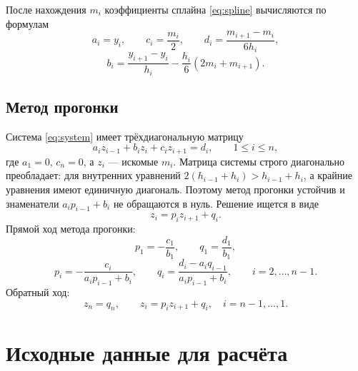 \documentclass[14pt,a4paper]{extarticle}
\begin{document}
После нахождения $m_i$ коэффициенты сплайна \eqref{eq:spline}
вычисляются по формулам
\begin{equation}
    a_i=y_i,\qquad
    c_i=\frac{m_i}{2},\qquad
    d_i=\frac{m_{i+1}-m_i}{6h_i},
    \label{eq:coeff-cd}
\end{equation}
\begin{equation}
    b_i=\frac{y_{i+1}-y_i}{h_i}
    -\frac{h_i}{6}\left(2m_i+m_{i+1}\right).
    \label{eq:coeff-b}
\end{equation}

\subsection{Метод прогонки}

Система \eqref{eq:system} имеет трёхдиагональную матрицу
\begin{equation}
    a_i z_{i-1}+b_i z_i+c_i z_{i+1}=d_i,\qquad 1\le i\le n,
    \label{eq:tridiag}
\end{equation}
где $a_1=0$, $c_n=0$, а $z_i$ --- искомые $m_i$. Матрица системы
строго диагонально преобладает: для внутренних уравнений
$2(h_{i-1}+h_i)>h_{i-1}+h_i$, а крайние уравнения имеют единичную
диагональ. Поэтому метод прогонки устойчив и знаменатели
$a_ip_{i-1}+b_i$ не обращаются в нуль. Решение ищется в виде
\begin{equation}
    z_i=p_i z_{i+1}+q_i .
    \label{eq:sweep-form}
\end{equation}
Прямой ход метода прогонки:
\begin{equation}
    p_1=-\frac{c_1}{b_1},\qquad q_1=\frac{d_1}{b_1},
    \label{eq:sweep-start}
\end{equation}
\begin{equation}
    p_i=-\frac{c_i}{a_i p_{i-1}+b_i},\qquad
    q_i=\frac{d_i-a_i q_{i-1}}{a_i p_{i-1}+b_i},
    \qquad i=2,\ldots,n-1.
    \label{eq:sweep-forward}
\end{equation}
Обратный ход:
\begin{equation}
    z_n=q_n,\qquad z_i=p_i z_{i+1}+q_i,\quad i=n-1,\ldots,1.
    \label{eq:sweep-back}
\end{equation}

\section{Исходные данные для расчёта}
\end{document}
